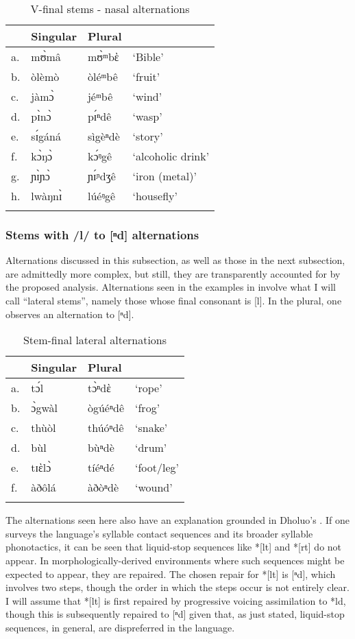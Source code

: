 \documentclass[output=paper,colorlinks,citecolor=brown]{langscibook}
\begin{document}
\begin{table}
\caption{V-final stems - nasal alternations}
\label{tab:StemNasalAlt}
 \begin{tabular}{llll}
  \lsptoprule
& Singular & Plural &  \\
\midrule
a.	&mʊ̀mâ&	mʊ̀ᵐbὲ	&`Bible'\\
b.&	òlèmò&	òléᵐbê&	`fruit'\\
c.&	jàmɔ̀&	jéᵐbê&	`wind'\\
d.&	pɪ̀nɔ̀&	pɪ́ⁿdê	&`wasp'\\
e.	&sɪ́gáná&	sìgèⁿdè 	&`story'\\
f.&	kɔ̀ŋɔ̀&	kɔ́ᵑgê	&`alcoholic drink'\\
g.&	ɲɪ̀ɲɔ̀&	ɲɪ́ᶮdʒê&	`iron (metal)'\\
h.&	lwàŋnɪ̀&	lúéᵑgê&	`housefly'\\
  \lspbottomrule
 \end{tabular}
\end{table}   

\subsubsection{Stems with /l/ to [ⁿd] alternations}
Alternations discussed in this subsection, as well as those in the next subsection, are admittedly more complex, but still, they are transparently accounted for by the proposed analysis. Alternations seen in the examples in  involve what I will call ``lateral stems'', namely those whose final consonant is [l]. In the plural, one observes an alternation to [ⁿd]. 

\begin{table}
\caption{Stem-final lateral alternations}
\label{tab:LateralAlt}
 \begin{tabular}{llll}
  \lsptoprule
& Singular & Plural &  \\
\midrule
a.	&tɔ́l	&tɔ̀ⁿdὲ&	`rope'\\
b.&	ɔ̀gwàl	&ògúéⁿdê	&`frog'\\
c.&	thùòl&	thúóⁿdê&	`snake'\\
d.&	bùl	&bùⁿdè	&`drum'\\
e.	&tɪὲlɔ̀&	tíéⁿdé	&`foot/leg'\\
f.	&àðôlá	&àðòⁿdè	&`wound'\\
  \lspbottomrule
 \end{tabular}
\end{table}   

The alternations seen here also have an explanation grounded in Dholuo's . If one surveys the language's syllable contact sequences and its broader syllable phonotactics, it can be seen that liquid-stop sequences like *[lt] and *[rt] do not appear. In morphologically-derived environments where such sequences might be expected to appear, they are repaired. The chosen repair for *[lt] is [ⁿd], which involves two steps, though the order in which the steps occur is not entirely clear. I will assume that *[lt] is first repaired by progressive voicing assimilation to *ld, though this is subsequently repaired to [ⁿd] given that, as just stated, liquid-stop sequences, in general, are dispreferred in the language.
\end{document}
